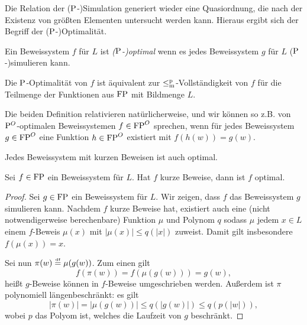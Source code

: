 
Die Relation der ($\P$-)Simulation generiert wieder eine Quasiordnung, die nach der Existenz von größten  Elementen untersucht werden kann. 
Hieraus ergibt sich der Begriff der ($\P$-)Optimalität.
\begin{definition}
    Ein Beweissystem $f$ für $L$ ist \emph{($\P$-)optimal} wenn es jedes Beweissystem $g$ für $L$ ($\P$-)simulieren kann.

    Die $\P$-Optimalität von $f$ ist äquivalent zur $\leqmp$-Vollständigkeit von $f$ für die Teilmenge der Funktionen aus $\FP$ mit Bildmenge $L$.
\end{definition}
Die beiden Definition relativieren natürlicherweise, und wir können so z.B. von $\P^O$-optimalen Beweissystemen $f\in\FP^O$ sprechen, wenn für jedes Beweissystem $g\in\FP^O$ eine Funktion $h\in\FP^O$ existiert mit $f(h(w))=g(w)$.

Jedes Beweissystem mit kurzen Beweisen ist auch optimal.
\begin{observation}\label{obs:super-ps-sind-opt}
    Sei $f\in\FP$ ein Beweissystem für $L$. Hat $f$ kurze Beweise, dann ist $f$ optimal.
\end{observation}
\begin{proof}
    Sei $g\in\FP$ ein Beweissystem für $L$. Wir zeigen, dass $f$ das Beweissystem $g$ simulieren kann.
    Nachdem $f$ kurze Beweise hat, existiert auch eine (nicht notwendigerweise berechenbare) Funktion $\mu$ und Polynom $q$ sodass $\mu$ jedem $x\in L$ einem $f$-Beweis $\mu(x)$ mit $|\mu(x)|\leq q(|x|)$ zuweist. Damit gilt insbesondere $f(\mu(x)) = x$.

    Sei nun $\pi(w)\defeq\mu(g(w))$. Zum einen gilt
    \[ f(\pi(w)) = f(\mu(g(w))) = g(w), \]
    heißt $g$-Beweise können in $f$-Beweise umgeschrieben werden.
    Außerdem ist $\pi$ polynomiell längenbeschränkt: es gilt
    \[ |\pi(w)|=|\mu(g(w))| \leq q(|g(w)|) \leq q(p(|w|)), \]
    wobei $p$ das Polyom ist, welches die Laufzeit von $g$ beschränkt.
\end{proof}

